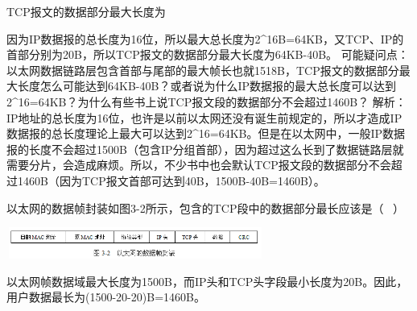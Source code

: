 \question TCP报文的数据部分最大长度为
\par{}
\begin{solution}因为IP数据报的总长度为16位，所以最大总长度为2\^{}16B=64KB，又TCP、IP的首部分别为20B，所以TCP报文的数据部分最大长度为64KB-40B。
可能疑问点：以太网数据链路层包含首部与尾部的最大帧长也就1518B，TCP报文的数据部分最大长度怎么可能达到64KB-40B？或者说为什么IP数据报的最大总长度可以达到2\^{}16=64KB？为什么有些书上说TCP报文段的数据部分不会超过1460B？
解析：IP地址的总长度为16位，也许是以前以太网还没有诞生前规定的，所以才造成IP数据报的总长度理论上最大可以达到2\^{}16=64KB。但是在以太网中，一般IP数据报的长度不会超过1500B（包含IP分组首部），因为超过这么长到了数据链路层就需要分片，会造成麻烦。所以，不少书中也会默认TCP报文段的数据部分不会超过1460B（因为TCP报文首部可达到40B，1500B-40B=1460B）。
\end{solution}
\question 以太网的数据帧封装如图3-2所示，包含的TCP段中的数据部分最长应该是（ ~）

\includegraphics[width=3.33333in,height=0.40625in]{computerassets/25d66fd7ecf9a4aa73d66c4295ed68fb.png}
\par{}
\begin{solution}以太网帧数据域最大长度为1500B，而IP头和TCP头字段最小长度为20B。因此，用户数据最长为(1500-20-20)B=1460B。
\end{solution}
